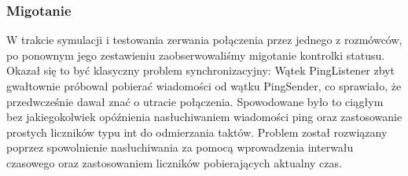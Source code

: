 \documentclass[a4paper,11pt]{article}
\begin{document}
\subsubsection{Migotanie}
W trakcie symulacji i testowania zerwania połączenia przez jednego z rozmówców, po ponownym jego zestawieniu zaobserwowaliśmy migotanie kontrolki statusu. Okazał się to być klasyczny problem synchronizacyjny:\newline
Wątek PingListener zbyt gwałtownie próbował pobierać wiadomości od wątku PingSender, co sprawiało, że przedwcześnie dawał znać o utracie połączenia.
Spowodowane było to ciągłym bez jakiegokolwiek opóźnienia nasłuchiwaniem wiadomości ping oraz zastosowanie prostych liczników typu int do odmierzania taktów.
Problem został rozwiązany poprzez spowolnienie nasłuchiwania za pomocą wprowadzenia interwału czasowego oraz zastosowaniem liczników pobierających aktualny czas.
\end{document}
